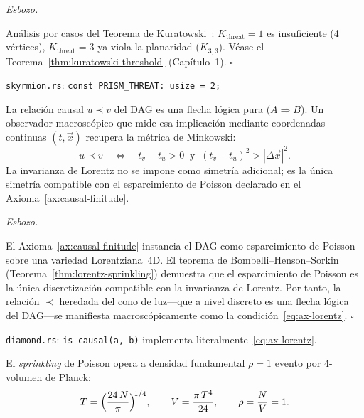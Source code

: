 \documentclass[11pt, a4paper, openany]{book}
\renewenvironment{proof}[1][Demostraci\'on]{%
  \par\noindent\textit{#1.}\quad
}{\hfill$\square$\par\medskip}
\begin{document}
\begin{proof}[Esbozo]
An\'alisis por casos del Teorema de Kuratowski~\cite{kuratowski1930}:
$K_{\text{threat}} = 1$ es insuficiente (4 v\'ertices),
$K_{\text{threat}} = 3$ ya viola la planaridad ($K_{3,3}$).
V\'ease el Teorema~\ref{thm:kuratowski-threshold} (Cap\'itulo~1).
\end{proof}

\medskip\noindent
\texttt{skyrmion.rs}: \texttt{const PRISM\_THREAT: usize = 2;}

\begin{theorem}
\label{thm:lorentzian-causality}
La relaci\'on causal $u \prec v$ del DAG es una flecha l\'ogica pura
($A \Rightarrow B$). Un observador macrosc\'opico que mide esa
implicaci\'on mediante coordenadas continuas $(t, \vec{x})$ recupera
la m\'etrica de Minkowski:
\begin{equation}
  u \prec v
  \quad\Longleftrightarrow\quad
  t_v - t_u > 0
  \;\;\text{y}\;\;
  (t_v - t_u)^2 > |\Delta\vec{x}|^2.
  \label{eq:ax-lorentz}
\end{equation}
La invarianza de Lorentz no se impone como simetr\'ia adicional;
es la \'unica simetr\'ia compatible con el esparcimiento de Poisson
declarado en el Axioma~\ref{ax:causal-finitude}.
\end{theorem}

\begin{proof}[Esbozo]
El Axioma~\ref{ax:causal-finitude} instancia el DAG como
esparcimiento de Poisson sobre una variedad Lorentziana~4D.
El teorema de Bombelli--Henson--Sorkin~\cite{bombelli2009}
(Teorema~\ref{thm:lorentz-sprinkling}) demuestra que el
esparcimiento de Poisson es la \'unica discretizaci\'on
compatible con la invarianza de Lorentz. Por tanto, la
relaci\'on $\prec$ heredada del cono de luz---que a nivel discreto
es una flecha l\'ogica del DAG---se manifiesta macrosc\'opicamente
como la condici\'on~\eqref{eq:ax-lorentz}.
\end{proof}

\medskip\noindent
\texttt{diamond.rs}: \texttt{is\_causal(a, b)} implementa
literalmente~\eqref{eq:ax-lorentz}.

\begin{theorem}
\label{thm:planck-density}
El \emph{sprinkling} de Poisson opera a densidad
fundamental $\rho = 1$ evento por 4-volumen de Planck:
\begin{equation}
  T = \Bigl(\frac{24\,N}{\pi}\Bigr)^{\!1/4},
  \qquad
  V = \frac{\pi\,T^4}{24},
  \qquad
  \rho = \frac{N}{V} = 1.
  \label{eq:ax-planck}
\end{equation}
\end{theorem}
\end{document}
